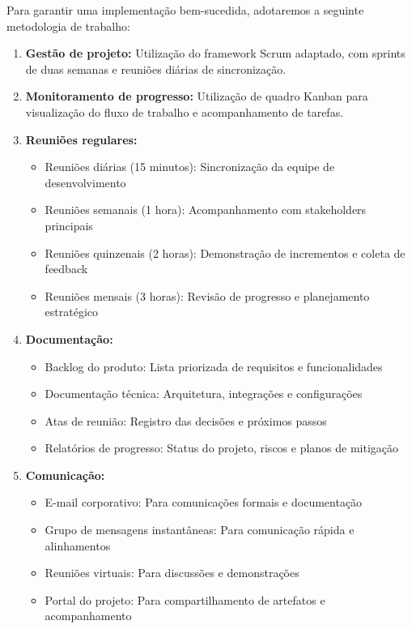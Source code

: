 \documentclass[12pt,a4paper]{article}
\begin{document}
Para garantir uma implementação bem-sucedida, adotaremos a seguinte metodologia de trabalho:

\begin{enumerate}
    \item \textbf{Gestão de projeto:} Utilização do framework Scrum adaptado, com sprints de duas semanas e reuniões diárias de sincronização.
    
    \item \textbf{Monitoramento de progresso:} Utilização de quadro Kanban para visualização do fluxo de trabalho e acompanhamento de tarefas.
    
    \item \textbf{Reuniões regulares:}
    \begin{itemize}
        \item Reuniões diárias (15 minutos): Sincronização da equipe de desenvolvimento
        \item Reuniões semanais (1 hora): Acompanhamento com stakeholders principais
        \item Reuniões quinzenais (2 horas): Demonstração de incrementos e coleta de feedback
        \item Reuniões mensais (3 horas): Revisão de progresso e planejamento estratégico
    \end{itemize}
    
    \item \textbf{Documentação:}
    \begin{itemize}
        \item Backlog do produto: Lista priorizada de requisitos e funcionalidades
        \item Documentação técnica: Arquitetura, integrações e configurações
        \item Atas de reunião: Registro das decisões e próximos passos
        \item Relatórios de progresso: Status do projeto, riscos e planos de mitigação
    \end{itemize}
    
    \item \textbf{Comunicação:}
    \begin{itemize}
        \item E-mail corporativo: Para comunicações formais e documentação
        \item Grupo de mensagens instantâneas: Para comunicação rápida e alinhamentos
        \item Reuniões virtuais: Para discussões e demonstrações
        \item Portal do projeto: Para compartilhamento de artefatos e acompanhamento
    \end{itemize}
    

\end{enumerate}
\end{document}
